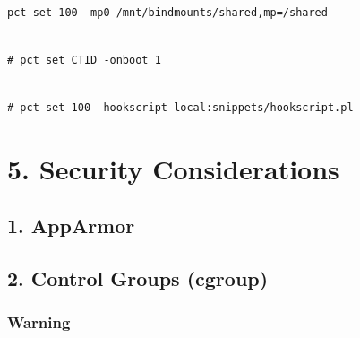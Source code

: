 \begin{lstlisting}

pct set 100 -mp0 /mnt/bindmounts/shared,mp=/shared

\end{lstlisting}

\begin{lstlisting}

# pct set CTID -onboot 1

\end{lstlisting}

\begin{lstlisting}

# pct set 100 -hookscript local:snippets/hookscript.pl

\end{lstlisting}

\begin{table}[htbp]

\centering

\begin{tabular}

\end{tabular}

\end{table}

\begin{table}[htbp]

\centering

\begin{tabular}

\end{tabular}

\end{table}


\section{5. Security Considerations}

\subsection{1. AppArmor}

\subsection{2. Control Groups (cgroup)}

\subsubsection{Warning}

